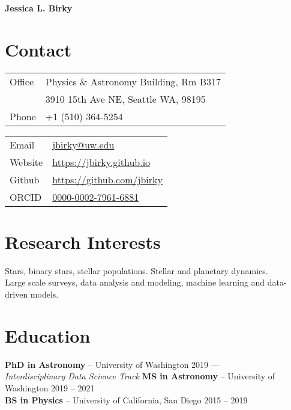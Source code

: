\documentclass[margin,line]{resume}
\begin{document}
{\sc \textbf{\Large Jessica L. Birky}} 
\vspace{0.3cm}
\begin{resume}

 
\section{\mysidestyle \textcolor{bcolor}{Contact}}

\noindent\begin{multicols}{2}\small
\noindent\begin{tabular}{@{}l|l}
  \multirow{1}{*}{Office}   & Physics \& Astronomy Building, Rm B317  \\
  \multirow{1}{*}{}         & 3910 15th Ave NE, Seattle WA, 98195  \\
  \multirow{1}{*}{Phone}    & +1 (510) 364-5254 \\
\end{tabular}

\noindent\begin{tabular}{@{}l|l}
  \multirow{1}{*}{Email}    &   \href{jbirky@uw.edu}{jbirky@uw.edu} \\
  \multirow{1}{*}{Website}  &   \href{https://jbirky.github.io/}{https://jbirky.github.io} \\
  \multirow{1}{*}{Github}   &   \href{https://github.com/jbirky}{https://github.com/jbirky} \\
  \multirow{1}{*}{ORCID}    &   \href{https://orcid.org/0000-0002-7961-6881}{0000-0002-7961-6881} \\
\end{tabular} 
\end{multicols}


\section{\mysidestyle \textcolor{bcolor}{Research Interests}}
Stars, binary stars, stellar populations. Stellar and planetary dynamics. \\
Large scale surveys, data analysis and modeling, machine learning and data-driven models. 
 
       
\section{\mysidestyle \textcolor{bcolor}{Education}}
\textbf{PhD in Astronomy} -- University of Washington  \hfill 2019 --- \\
\textsl{Interdisciplinary Data Science Track} \vspace{.1cm} \newline
\textbf{MS in Astronomy} -- University of Washington  \hfill 2019 -- 2021 \\
\textbf{BS in Physics} -- University of California, San Diego \hfill 2015 -- 2019 


\end{resume}
\end{document}
